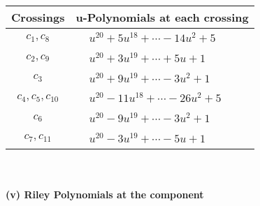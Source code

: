 \documentclass[1p]{elsarticle_modified}
\theoremstyle{definition}
\begin{document}
\begin{tabular}{m{50pt}|m{274pt}}
Crossings & \hspace{64pt}u-Polynomials at each crossing \\
\hline $$\begin{aligned}c_{1},c_{8}\end{aligned}$$&$\begin{aligned}
&u^{20}+5 u^{18}+\cdots-14 u^2+5
\end{aligned}$\\
\hline $$\begin{aligned}c_{2},c_{9}\end{aligned}$$&$\begin{aligned}
&u^{20}+3 u^{19}+\cdots+5 u+1
\end{aligned}$\\
\hline $$\begin{aligned}c_{3}\end{aligned}$$&$\begin{aligned}
&u^{20}+9 u^{19}+\cdots-3 u^2+1
\end{aligned}$\\
\hline $$\begin{aligned}c_{4},c_{5},c_{10}\end{aligned}$$&$\begin{aligned}
&u^{20}-11 u^{18}+\cdots-26 u^2+5
\end{aligned}$\\
\hline $$\begin{aligned}c_{6}\end{aligned}$$&$\begin{aligned}
&u^{20}-9 u^{19}+\cdots-3 u^2+1
\end{aligned}$\\
\hline $$\begin{aligned}c_{7},c_{11}\end{aligned}$$&$\begin{aligned}
&u^{20}-3 u^{19}+\cdots-5 u+1
\end{aligned}$\\
\hline
\end{tabular}\\~\\
\newpage\renewcommand{\arraystretch}{1}
\flushleft \textbf{(v) Riley Polynomials at the component}\newline \\
\end{document}
